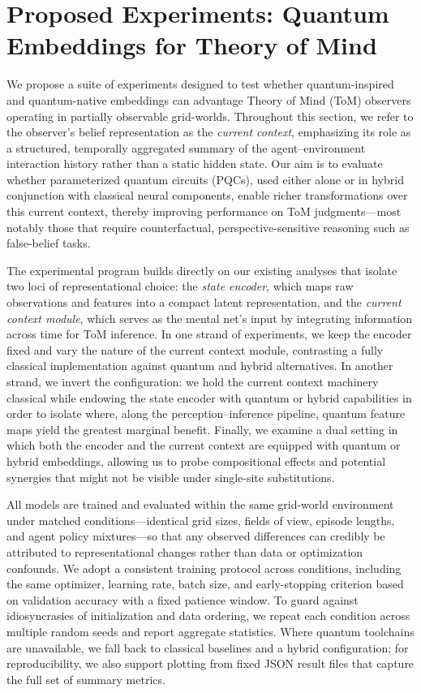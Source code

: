 \section{Proposed Experiments: Quantum Embeddings for Theory of Mind}
\label{sec:experiments-prose}

We propose a suite of experiments designed to test whether quantum-inspired and quantum-native embeddings can advantage Theory of Mind (ToM) observers operating in partially observable grid-worlds. Throughout this section, we refer to the observer’s belief representation as the \emph{current context}, emphasizing its role as a structured, temporally aggregated summary of the agent–environment interaction history rather than a static hidden state. Our aim is to evaluate whether parameterized quantum circuits (PQCs), used either alone or in hybrid conjunction with classical neural components, enable richer transformations over this current context, thereby improving performance on ToM judgments—most notably those that require counterfactual, perspective-sensitive reasoning such as false-belief tasks.

The experimental program builds directly on our existing analyses that isolate two loci of representational choice: the \emph{state encoder}, which maps raw observations and features into a compact latent representation, and the \emph{current context module}, which serves as the mental net’s input by integrating information across time for ToM inference. In one strand of experiments, we keep the encoder fixed and vary the nature of the current context module, contrasting a fully classical implementation against quantum and hybrid alternatives. In another strand, we invert the configuration: we hold the current context machinery classical while endowing the state encoder with quantum or hybrid capabilities in order to isolate where, along the perception–inference pipeline, quantum feature maps yield the greatest marginal benefit. Finally, we examine a dual setting in which both the encoder and the current context are equipped with quantum or hybrid embeddings, allowing us to probe compositional effects and potential synergies that might not be visible under single-site substitutions.

All models are trained and evaluated within the same grid-world environment under matched conditions—identical grid sizes, fields of view, episode lengths, and agent policy mixtures—so that any observed differences can credibly be attributed to representational changes rather than data or optimization confounds. We adopt a consistent training protocol across conditions, including the same optimizer, learning rate, batch size, and early-stopping criterion based on validation accuracy with a fixed patience window. To guard against idiosyncrasies of initialization and data ordering, we repeat each condition across multiple random seeds and report aggregate statistics. Where quantum toolchains are unavailable, we fall back to classical baselines and a hybrid configuration; for reproducibility, we also support plotting from fixed JSON result files that capture the full set of summary metrics.

